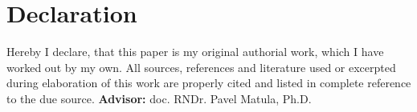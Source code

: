 \chapter*{Declaration}

\noindent
Hereby I declare, that this paper is my original authorial work, which I
have worked out by my own. All sources, references and literature used or
excerpted during elaboration of this work are properly cited and listed in
complete reference to the due source.
\vfill
\textbf{Advisor:} doc. RNDr. Pavel Matula, Ph.D.